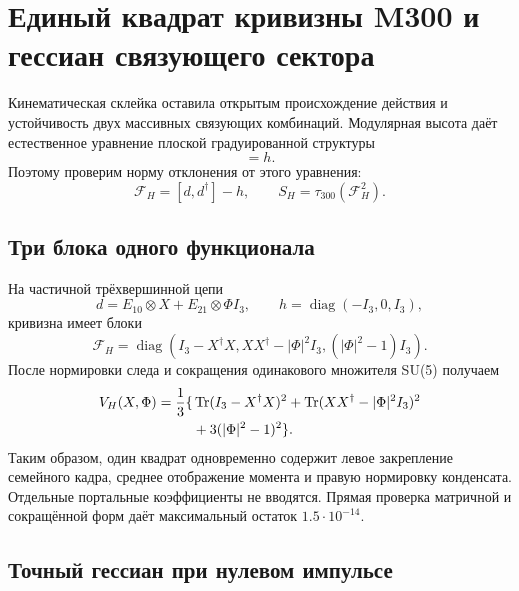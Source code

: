 \chapter{Единый квадрат кривизны M300 и гессиан связующего сектора}

Кинематическая склейка оставила открытым происхождение действия и
устойчивость двух массивных связующих комбинаций. Модулярная высота даёт
естественное уравнение плоской градуированной структуры
\begin{equation}
 [d,d^\dagger]=h.
\end{equation}
Поэтому проверим норму отклонения от этого уравнения:
\begin{equation}
 \mathcal F_H=[d,d^\dagger]-h,
 \qquad
 S_H=\tau_{300}(\mathcal F_H^2).
 \label{eq:v5-m300-hodge-action}
\end{equation}

\section{Три блока одного функционала}

На частичной трёхвершинной цепи
\begin{equation}
 d=E_{10}\otimes X+E_{21}\otimes\Phi I_3,
 \qquad h=\operatorname{diag}(-I_3,0,I_3),
\end{equation}
кривизна имеет блоки
\begin{equation}
 \mathcal F_H=\operatorname{diag}\left(
 I_3-X^\dagger X,
 XX^\dagger-|\Phi|^2I_3,
 (|\Phi|^2-1)I_3
 \right).
\end{equation}
После нормировки следа и сокращения одинакового множителя SU(5) получаем
\begin{equation}
 \begin{split}
 V_H(X,\Phi)=\frac13\{&
 \operatorname{Tr}(I_3-X^\dagger X)^2
 +\operatorname{Tr}(XX^\dagger-|\Phi|^2I_3)^2\\
 &+3(|\Phi|^2-1)^2\}.
 \end{split}
 \label{eq:v5-m300-reduced-potential}
\end{equation}
Таким образом, один квадрат одновременно содержит левое закрепление
семейного кадра, среднее отображение момента и правую нормировку
конденсата. Отдельные портальные коэффициенты не вводятся. Прямая проверка
матричной и сокращённой форм даёт максимальный остаток
\(1.5\cdot10^{-14}\).

\section{Точный гессиан при нулевом импульсе}


